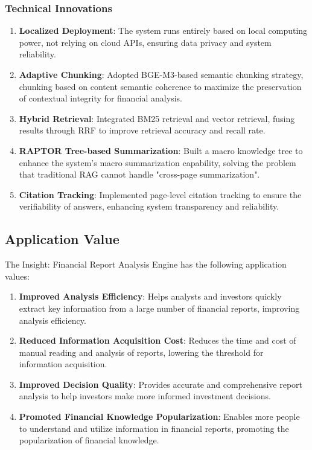 \subsubsection{Technical Innovations}

\begin{enumerate}
\item \textbf{Localized Deployment}: The system runs entirely based on local computing power, not relying on cloud APIs, ensuring data privacy and system reliability.

\item \textbf{Adaptive Chunking}: Adopted BGE-M3-based semantic chunking strategy, chunking based on content semantic coherence to maximize the preservation of contextual integrity for financial analysis.

\item \textbf{Hybrid Retrieval}: Integrated BM25 retrieval and vector retrieval, fusing results through RRF to improve retrieval accuracy and recall rate.

\item \textbf{RAPTOR Tree-based Summarization}: Built a macro knowledge tree to enhance the system's macro summarization capability, solving the problem that traditional RAG cannot handle "cross-page summarization".

\item \textbf{Citation Tracking}: Implemented page-level citation tracking to ensure the verifiability of answers, enhancing system transparency and reliability.
\end{enumerate}

\subsection{Application Value}

The Insight: Financial Report Analysis Engine has the following application values:

\begin{enumerate}
\item \textbf{Improved Analysis Efficiency}: Helps analysts and investors quickly extract key information from a large number of financial reports, improving analysis efficiency.

\item \textbf{Reduced Information Acquisition Cost}: Reduces the time and cost of manual reading and analysis of reports, lowering the threshold for information acquisition.

\item \textbf{Improved Decision Quality}: Provides accurate and comprehensive report analysis to help investors make more informed investment decisions.

\item \textbf{Promoted Financial Knowledge Popularization}: Enables more people to understand and utilize information in financial reports, promoting the popularization of financial knowledge.
\end{enumerate}

